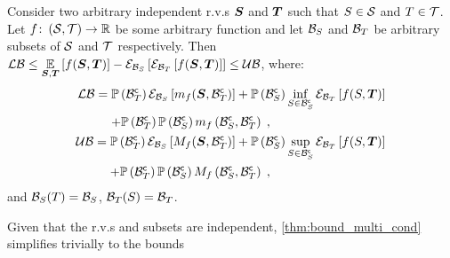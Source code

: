 \begin{propositionE}
	\label{thm:bound_multi_ind}
	Consider two arbitrary independent r.v.s $\RV$ and $\RVI$ such that $\variable\in\Space$ and $\variableI\in\SpaceI$. Let $f\colon\left(\Space,\SpaceI\right)\to\R$ be some arbitrary function and let $\subSpaceI{\variable}$ and $\subSpaceI{\variableI}$ be arbitrary subsets of $\Space$ and $\SpaceI$ respectively. Then $\lowerbound\leq\expectation{f(\RV,\RVI)}{\RV,\RVI}-\partialexpectation{\partialexpectation{f(\RV,\RVI)}{\subSpaceI{\variableI}}}{\subSpaceI{\variable}}\leq\upperbound$, where:
	\begin{subequations}
		\begin{align}
			\begin{split}
				\lowerbound & = \measure{\stcompI{\subSpace}{\variableI}}\partialexpectation{m_f(\RV,\stcompI{\subSpace}{\variableI})}{\subSpaceI{\variable}}
				+\measure{\stcompI{\subSpace}{\variable}}\inf_{\variable\in\stcompI{\subSpace}{\variable}}\partialexpectation{f(\variable,\RVI)}{\subSpaceI{\variableI}}\\
				&\phantomeq+\measure{\stcompI{\subSpace}{\variableI}}\measure{\stcompI{\subSpace}{\variable}}m_f\left(\stcompI{\subSpace}{\variable},\stcompI{\subSpace}{\variableI}\right)\;,
			\end{split}
			\\
			\begin{split}
				\upperbound & = \measure{\stcompI{\subSpace}{\variableI}}\partialexpectation{M_f(\RV,\stcompI{\subSpace}{\variableI})}{\subSpaceI{\variable}}
				+\measure{\stcompI{\subSpace}{\variable}}\sup_{\variable\in\stcompI{\subSpace}{\variable}}\partialexpectation{f(\variable,\RVI)}{\subSpaceI{\variableI}}\\
				&\phantomeq+\measure{\stcompI{\subSpace}{\variableI}}\measure{\stcompI{\subSpace}{\variable}}M_f\left(\stcompI{\subSpace}{\variable},\stcompI{\subSpace}{\variableI}\right)\;,
			\end{split}
		\end{align}
	\end{subequations}
	and $\subSpaceI{\variable}(\variableI)=\subSpaceI{\variable}$, $\subSpaceI{\variableI}(\variable)=\subSpaceI{\variableI}$.
\end{propositionE}
\begin{proofE}
	Given that the r.v.s and subsets are independent, \cref{thm:bound_multi_cond} simplifies trivially to the bounds
\end{proofE}

